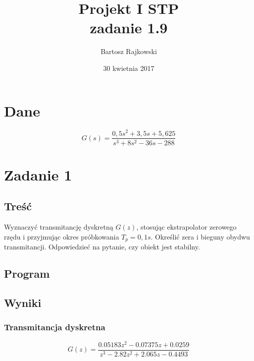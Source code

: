\documentclass{article}
\author{Bartosz Rajkowski}
\title{Projekt I STP\\zadanie 1.9}
\date{30 kwietnia 2017}
\begin{document}
\maketitle
\newpage
\tableofcontents
\newpage

\section*{Dane}
$$
G(s)=\frac{0,5s^2+3,5s+5,625}{s^3+8s^2-36s-288}
$$
\section{Zadanie 1}
\subsection{Treść}

Wyznaczyć transmitancję dyskretną $G(z)$, stosując ekstrapolator zerowego rzędu i przyjmując okres próbkowania $T_p=0,1s$. Określić zera i bieguny obydwu transmitancji. Odpowiedzieć na pytanie, czy obiekt jest stabilny.

\subsection{Program}

\subsection{Wyniki}
\subsubsection{Transmitancja dyskretna}
$$
G(z)=\frac{0.05183 z^2 - 0.07375 z + 0.0259}{z^3 - 2.82 z^2 + 2.065 z - 0.4493}
$$
\end{document}
